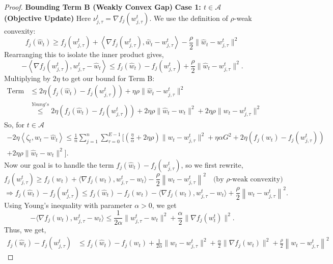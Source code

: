 \documentclass{article} %
\newcommand\norm[1]{\left\lVert#1\right\rVert}
\def\A{{\mathcal A}}
\begin{document}
\begin{proof}
    \textbf{Bounding Term B (Weakly Convex Gap)}
    \textbf{Case 1: $t \in \mathcal{A}$ (Objective Update)}
    Here $\nu_{j,\tau}^t = \nabla f_j(w_{j,\tau}^t)$. We use the definition of {$\rho$-weak convexity}:
    \[
    f_j(\hat{w}_t) \geq f_j(w_{j,\tau}^t) + \left\langle \nabla f_j(w_{j,\tau}^t), \hat{w}_t - w_{j,\tau}^t \right\rangle - \frac{\rho}{2} \|\hat{w}_t - w_{j,\tau}^t\|^2
    \]
    Rearranging this to isolate the inner product gives,
    \[
    - \left\langle \nabla f_j(w_{j,\tau}^t), w_{j,\tau}^t - \hat{w}_t \right\rangle \leq f_j(\hat{w}_t) - f_j(w_{j,\tau}^t) + \frac{\rho}{2} \|\hat{w}_t - w_{j,\tau}^t\|^2.
    \]
    Multiplying by $2\eta$ to get our bound for Term B:
    \begin{align*}
    \text{Term B} &\leq 2\eta \left( f_j(\hat{w}_t) - f_j(w_{j,\tau}^t) \right) + \eta\rho \|\hat{w}_t - w_{j,\tau}^t\|^2
    \\
    &\overset{Young's}{\leq}2\eta \left( f_j(\hat{w}_t) - f_j(w_{j,\tau}^t) \right) + 2\eta\rho \|\hat{w}_t - w_t\|^2 + 2\eta\rho \|{w}_t - w_{j,\tau}^t\|^2
    \end{align*}
    So, for $t \in \A$
    \begin{align*}
        -2\eta \left\langle \zeta_t, w_t - \hat{w}_t \right\rangle \leq \frac{1}{n} \sum_{j=1}^n \sum_{\tau=0}^{E-1} \bigg[ (\frac{\eta}{\alpha} + 2\eta\rho) \| w_t - w_{j,\tau}^t \|^2 + \eta \alpha G^2 + 2\eta (f_j(\hat{w}_t) - f_j(w_{j,\tau}^t)) 
        \\
        + 2\eta\rho \|\hat{w}_t - w_t\|^2 \bigg].
    \end{align*}
    Now our goal is to handle the term \( f_j(\hat{w}_t) - f_j(w_{j,\tau}^t) \), so we first rewrite,
    \[
    f_j(w_{j,\tau}^t) \geq f_j(w_t) + \langle \nabla f_j(w_t), w_{j,\tau}^t - w_t \rangle -\frac{\rho}{2}\norm{w_t - w_{j,\tau}^t}^2 \quad \text{(by $\rho$-weak convexity)}
    \]
    \[
    \Rightarrow f_j(\hat{w}_t) - f_j(w_{j,\tau}^t) 
    \leq f_j(\hat{w}_t) - f_j(w_t) - \langle \nabla f_j(w_t), w_{j,\tau}^t - w_t \rangle + \frac{\rho}{2}\norm{w_t - w_{j,\tau}^t}^2.
    \]
    Using Young's inequality with parameter \(\alpha > 0\), we get
    \[
    -\langle \nabla f_j(w_t), w_{j,\tau}^t - w_t \rangle 
    \leq \frac{1}{2\alpha} \| w_{j,\tau}^t - w_t \|^2 + \frac{\alpha}{2} \| \nabla f_j(w_t^t) \|^2.
    \]
    Thus, we get,
    \begin{align*}
    f_j(\hat{w}_t) - f_j(w_{j,\tau}^t)
    &\leq f_j(\hat{w}_t) - f_j(w_t) + \frac{1}{2\alpha} \| w_t - w_{j,\tau}^t \|^2 + \frac{\alpha}{2} \| \nabla f_j(w_t) \|^2 + \frac{\rho}{2}\norm{w_t - w_{j,\tau}^t}^2

\end{align*}
\end{proof}
\end{document}
